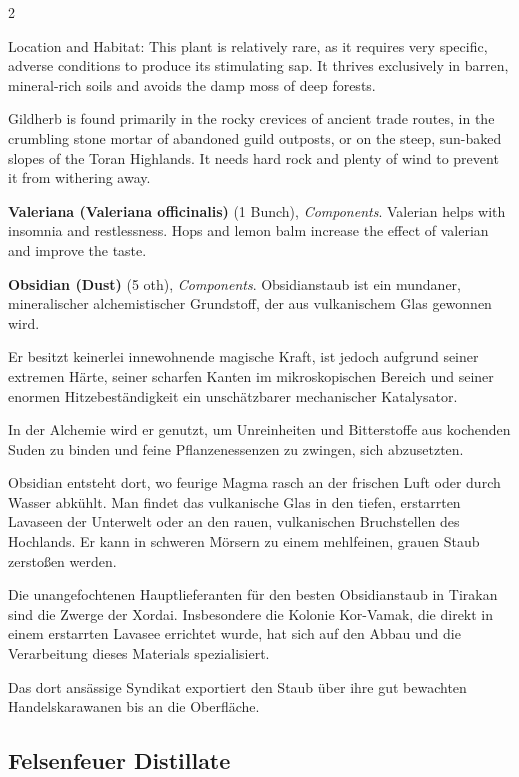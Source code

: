 \begin{multicols}{2}
\begin{denseitemize}
Location and Habitat:
This plant is relatively rare, as it requires very specific, adverse conditions to produce its stimulating sap. It thrives exclusively in barren, mineral-rich soils and avoids the damp moss of deep forests.

Gildherb is found primarily in the rocky crevices of ancient trade routes, in the crumbling stone mortar of abandoned guild outposts, or on the steep, sun-baked slopes of the Toran Highlands. It needs hard rock and plenty of wind to prevent it from withering away.
        \item \textbf{Valeriana (Valeriana officinalis)} (1 Bunch), \textit{Components}.
        Valerian helps with insomnia and restlessness. Hops and lemon balm increase the effect of valerian and improve the taste.
        \item \textbf{Obsidian (Dust)} (5 oth), \textit{Components}.
        Obsidianstaub ist ein mundaner, mineralischer alchemistischer Grundstoff, der aus vulkanischem Glas gewonnen wird.

Er besitzt keinerlei innewohnende magische Kraft, ist jedoch aufgrund seiner extremen Härte, seiner scharfen Kanten im mikroskopischen Bereich und seiner enormen Hitzebeständigkeit ein unschätzbarer mechanischer Katalysator.

In der Alchemie wird er genutzt, um Unreinheiten und Bitterstoffe aus kochenden Suden zu binden und feine Pflanzenessenzen zu zwingen, sich abzusetzten.

Obsidian entsteht dort, wo feurige Magma rasch an der frischen Luft oder durch Wasser abkühlt. Man findet das vulkanische Glas in den tiefen, erstarrten Lavaseen der Unterwelt oder an den rauen, vulkanischen Bruchstellen des Hochlands.
Er kann in schweren Mörsern zu einem mehlfeinen, grauen Staub zerstoßen werden.

Die unangefochtenen Hauptlieferanten für den besten Obsidianstaub in Tirakan sind die Zwerge der Xordai. Insbesondere die Kolonie Kor-Vamak, die direkt in einem erstarrten Lavasee errichtet wurde, hat sich auf den Abbau und die Verarbeitung dieses Materials spezialisiert.

Das dort ansässige Syndikat exportiert den Staub über ihre gut bewachten Handelskarawanen bis an die Oberfläche.
    \end{denseitemize}


    \subsection*{Felsenfeuer Distillate}


\end{multicols}
